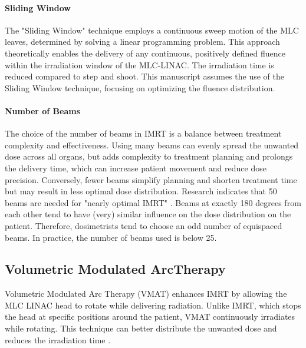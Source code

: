 
\paragraph[SW]{Sliding Window}
The "Sliding Window" technique employs a continuous sweep motion of the MLC leaves, determined by solving a linear programming problem.
This approach theoretically enables the delivery of any continuous, positively defined fluence within the irradiation window of the MLC-LINAC.
The irradiation time is reduced compared to step and shoot.
This manuscript assumes the use of the Sliding Window technique, focusing on optimizing the fluence distribution.


\paragraph{Number of Beams}
The choice of the number of beams in IMRT is a balance between treatment complexity and effectiveness.
Using many beams can evenly spread the unwanted dose across all organs, but adds complexity to treatment planning and prolongs the delivery time, which can increase patient movement and reduce dose precision.
Conversely, fewer beams simplify planning and shorten treatment time but may result in less optimal dose distribution.
Research indicates that 50 beams are needed for "nearly optimal IMRT" \cite{Fenwick2011}.
Beams at exactly 180 degrees from each other tend to have (very) similar influence on the dose distribution on the patient.
Therefore, dosimetrists tend to choose an odd number of equispaced beams.
In practice, the number of beams used is below 25.


\subsection[VMAT]{Volumetric Modulated ArcTherapy}
Volumetric Modulated Arc Therapy (VMAT) enhances IMRT by allowing the MLC LINAC head to rotate while delivering radiation.
Unlike IMRT, which stops the head at specific positions around the patient, VMAT continuously irradiates while rotating.
This technique can better distribute the unwanted dose and reduces the irradiation time \cite{Hardcastle2011}.


